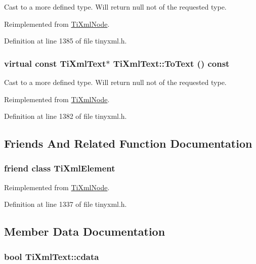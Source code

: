 Cast to a more defined type. Will return null not of the requested type. 

Reimplemented from \hyperlink{class_ti_xml_node_a3ddfbcac78fbea041fad57e5c6d60a03}{TiXmlNode}.

Definition at line 1385 of file tinyxml.h.\hypertarget{class_ti_xml_text_a895bf34ffad17f7439ab2a52b9651648}{
\subsubsection[{ToText}]{\setlength{\rightskip}{0pt plus 5cm}virtual const {\bf TiXmlText}$\ast$ TiXmlText::ToText () const}}
\label{class_ti_xml_text_a895bf34ffad17f7439ab2a52b9651648}


Cast to a more defined type. Will return null not of the requested type. 

Reimplemented from \hyperlink{class_ti_xml_node_a95a46a52c525992d6b4ee08beb14cd69}{TiXmlNode}.

Definition at line 1382 of file tinyxml.h.

\subsection{Friends And Related Function Documentation}
\hypertarget{class_ti_xml_text_ab6592e32cb9132be517cc12a70564c4b}{
\subsubsection[{TiXmlElement}]{\setlength{\rightskip}{0pt plus 5cm}friend class {\bf TiXmlElement}}}
\label{class_ti_xml_text_ab6592e32cb9132be517cc12a70564c4b}


Reimplemented from \hyperlink{class_ti_xml_node_ab6592e32cb9132be517cc12a70564c4b}{TiXmlNode}.

Definition at line 1337 of file tinyxml.h.

\subsection{Member Data Documentation}
\hypertarget{class_ti_xml_text_a1919a0467daf2cf5d099b225add5b9f1}{
\subsubsection[{cdata}]{\setlength{\rightskip}{0pt plus 5cm}bool {\bf TiXmlText::cdata}}}
\label{class_ti_xml_text_a1919a0467daf2cf5d099b225add5b9f1}


